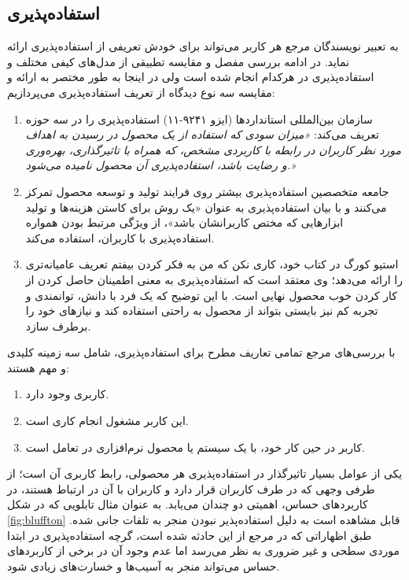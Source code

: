  \subsection{استفاده‌پذیری}
 به تعبیر نویسندگان مرجع
 \cite{albert_measuring_2013}
هر کاربر می‌تواند برای خودش تعریفی از استفاده‌پذیری ارائه نماید. در ادامه بررسی مفصل و مقایسه تطبیقی از مدل‌های کیفی مختلف و استفاده‌پذیری در هرکدام انجام شده است ولی در اینجا به طور مختصر به ارائه و مقایسه سه نوع دیدگاه از تعریف استفاده‌پذیری می‌پردازیم:
\begin{enumerate}
	\item 
	سازمان بین‌المللی استانداردها (ایزو ۹۲۴۱-۱۱) استفاده‌پذیری را در سه حوزه تعریف می‌کند:
	\emph{«میزان سودی که استفاده از یک محصول در رسیدن به اهداف مورد نظر کاربران در رابطه با کاربردی مشخص، که همراه با تاثیرگذاری، بهره‌وری و رضایت باشد، استفاده‌پذیری آن محصول نامیده می‌شود.»}
	\item
	جامعه متخصصین استفاده‌پذیری
	بیشتر روی فرایند تولید و توسعه محصول تمرکز می‌کنند و با بیان استفاده‌پذیری به عنوان «یک روش برای کاستن هزینه‌ها و تولید ابزارهایی که مختص کاربرانشان باشد»، از ویژگی مرتبط بودن همواره استفاده‌پذیری با کاربران، استفاده می‌کند.
	\item 
	استیو کورگ در کتاب خود، کاری نکن که من به فکر کردن بیفتم  تعریف عامیانه‌تری را ارائه می‌دهد؛ وی معتقد است که استفاده‌پذیری به معنی اطمینان حاصل کردن از کار کردن خوب محصول نهایی است. با این توضیح که یک فرد با دانش، توانمندی و تجربه کم نیز بایستی بتواند از محصول به راحتی استفاده کند و نیازهای خود را برطرف سازد.
\end{enumerate}
 با بررسی‌های مرجع
 \cite{albert_measuring_2013}
 تمامی تعاریف مطرح برای استفاده‌پذیری، شامل سه زمینه کلیدی و مهم هستند:
 \begin{enumerate}
 	\item 
 	کاربری وجود دارد.
 	\item 
 	این کاربر مشغول انجام کاری است.
 	\item 
 	کاربر در حین کار خود، با یک سیستم یا محصول نرم‌افزاری در تعامل است.
 \end{enumerate}
 یکی از عوامل بسیار تاثیرگذار در استفاده‌پذیری هر محصولی، رابط کاربری آن است؛ از طرفی وجهی که در طرف کاربران قرار دارد و کاربران با آن‌ در ارتباط هستند، در کاربردهای حساس، اهمیتی دو چندان می‌یابد. به عنوان مثال تابلویی که در شکل
\ref{fig:bluffton}
قابل مشاهده است به دلیل استفاده‌پذیر نبودن منجر به تلفات جانی شده. طبق اظهاراتی که در مرجع 
\cite{albert_measuring_2013}
از این حادثه شده است، گرچه استفاده‌پذیری در ابتدا موردی سطحی و غیر ضروری به نظر می‌رسد اما عدم وجود آن در برخی از کاربردهای حساس می‌تواند منجر به آسیب‌ها و خسارت‌های زیادی شود.
